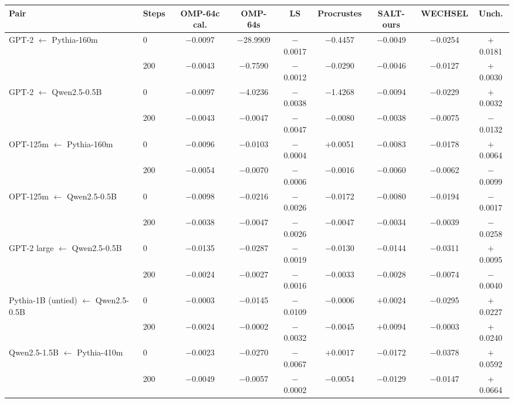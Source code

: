 \begin{tabular}{llccccccc}
\toprule
Pair & Steps & OMP-64c cal. & OMP-64s & LS & Procrustes & SALT-ours & WECHSEL & Unch. \\
\midrule
GPT-2 $\leftarrow$ Pythia-160m & 0 & $-$0.0097 & $-$28.9909 & $-$0.0017 & $-$0.4457 & $-$0.0049 & $-$0.0254 & $+$0.0181 \\
 & 200 & $-$0.0043 & $-$0.7590 & $-$0.0012 & $-$0.0290 & $-$0.0046 & $-$0.0127 & $+$0.0030 \\
\addlinespace
GPT-2 $\leftarrow$ Qwen2.5-0.5B & 0 & $-$0.0097 & $-$4.0236 & $-$0.0038 & $-$1.4268 & $-$0.0094 & $-$0.0229 & $+$0.0032 \\
 & 200 & $-$0.0043 & $-$0.0047 & $-$0.0047 & $-$0.0080 & $-$0.0038 & $-$0.0075 & $-$0.0132 \\
\addlinespace
OPT-125m $\leftarrow$ Pythia-160m & 0 & $-$0.0096 & $-$0.0103 & $-$0.0004 & $+$0.0051 & $-$0.0083 & $-$0.0178 & $+$0.0064 \\
 & 200 & $-$0.0054 & $-$0.0070 & $-$0.0006 & $-$0.0016 & $-$0.0060 & $-$0.0062 & $-$0.0099 \\
\addlinespace
OPT-125m $\leftarrow$ Qwen2.5-0.5B & 0 & $-$0.0098 & $-$0.0216 & $-$0.0026 & $-$0.0172 & $-$0.0080 & $-$0.0194 & $-$0.0017 \\
 & 200 & $-$0.0038 & $-$0.0047 & $-$0.0026 & $-$0.0047 & $-$0.0034 & $-$0.0039 & $-$0.0258 \\
\addlinespace
GPT-2 large $\leftarrow$ Qwen2.5-0.5B & 0 & $-$0.0135 & $-$0.0287 & $-$0.0019 & $-$0.0130 & $-$0.0144 & $-$0.0311 & $+$0.0095 \\
 & 200 & $-$0.0024 & $-$0.0027 & $-$0.0016 & $-$0.0033 & $-$0.0028 & $-$0.0074 & $-$0.0040 \\
\addlinespace
Pythia-1B (untied) $\leftarrow$ Qwen2.5-0.5B & 0 & $-$0.0003 & $-$0.0145 & $-$0.0109 & $-$0.0006 & $+$0.0024 & $-$0.0295 & $+$0.0227 \\
 & 200 & $-$0.0024 & $-$0.0002 & $-$0.0032 & $-$0.0045 & $+$0.0094 & $-$0.0003 & $+$0.0240 \\
\addlinespace
Qwen2.5-1.5B $\leftarrow$ Pythia-410m & 0 & $-$0.0023 & $-$0.0270 & $-$0.0067 & $+$0.0017 & $-$0.0172 & $-$0.0378 & $+$0.0592 \\
 & 200 & $-$0.0049 & $-$0.0057 & $-$0.0002 & $-$0.0054 & $-$0.0129 & $-$0.0147 & $+$0.0664 \\
\bottomrule
\end{tabular}
